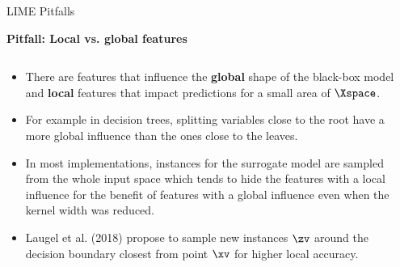 \documentclass[11pt,compress,t,notes=noshow, xcolor=table]{beamer}
\begin{document}
\begin{vbframe}{LIME Pitfalls}

\textbf{Pitfall: Local vs. global features}

\begin{columns}
	\begin{column}{0.78\textwidth}
\begin{itemize}
	\item There are features that influence the \textbf{global} shape of the black-box model and \textbf{local} features that impact predictions for a small area of $\Xspace$. 
	\item For example in decision trees, splitting variables close to the root have a more global influence than the ones close to the leaves. 
	\item In most implementations, instances for the surrogate model are sampled from the whole input space which tends to hide the features with a local influence for the benefit of features with a global influence even when the kernel width was reduced. 
	\item Laugel et al. (2018) propose to sample new instances $\zv$ around the decision boundary closest from point $\xv$ for higher local accuracy.
\end{itemize}
\end{column}
\begin{column}{0.2\textwidth}


\end{column}
\end{columns}
\end{vbframe}
\end{document}

